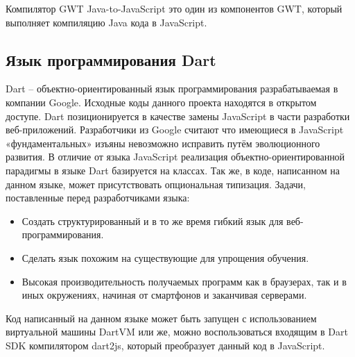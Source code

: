 Компилятор GWT Java-to-JavaScript это один из компонентов GWT, который выполняет компиляцию Java кода в JavaScript.


\subsection{Язык программирования Dart}

Dart -- объектно-ориентированный язык программирования разрабатываемая в компании Google. Исходные коды данного проекта находятся в открытом доступе. Dart позиционируется в качестве замены JavaScript в части разработки веб-приложений. Разработчики из Google считают что имеющиеся в JavaScript «фундаментальных» изъяны невозможно исправить путём эволюционного развития. В отличие от языка JavaScript реализация объектно-ориентированной парадигмы в языке Dart базируется на классах. Так же, в коде, написанном на данном языке, может присутствовать опциональная типизация.
\cite{wiki:Dart:en}
Задачи, поставленные перед разработчиками языка:\cite{Dart}
\begin{itemize}
\item Создать структурированный и в то же время гибкий язык для веб-программирования.
\item Сделать язык похожим на существующие для упрощения обучения.
\item Высокая производительность получаемых программ как в браузерах, так и в иных окружениях, начиная от смартфонов и заканчивая серверами.
\end{itemize}

Код написанный на данном языке может быть запущен с использованием виртуальной машины DartVM или же, можно воспользоваться входящим в Dart SDK компилятором dart2js, который преобразует данный код в JavaScript.\cite{Dart}


